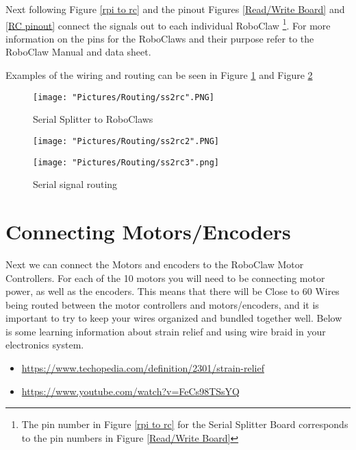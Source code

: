 \documentclass[12pt]{article}
\begin{document}
Next following Figure \ref{rpi to rc} and the pinout Figures \ref{Read/Write Board} and \ref{RC pinout} connect the signals out to each individual RoboClaw \footnote{The pin number in Figure \ref{rpi to rc} for the Serial Splitter Board corresponds to the pin numbers in Figure \ref{Read/Write Board}}. For more information on the pins for the RoboClaws and their purpose refer to the RoboClaw Manual and data sheet. 

\noindent Examples of the wiring and routing can be seen in Figure \ref{ss2rc1} and Figure \ref{ss2rc2}

\begin{figure}[H]
 	\centering
	\texttt{[image: "Pictures/Routing/ss2rc".PNG]}
 	\caption{Serial Splitter to RoboClaws}
	\label{ss2rc1}
\end{figure}

\begin{figure}[H]
 	\centering
  	\begin{minipage}[b]{0.50\textwidth}
		\texttt{[image: "Pictures/Routing/ss2rc2".PNG]}
  	\end{minipage}
  	\hfill
  	\begin{minipage}[b]{0.40\textwidth}
    		\texttt{[image: "Pictures/Routing/ss2rc3".png]}
  	\end{minipage}
	\caption{Serial signal routing}
	\label{ss2rc2}
\end{figure}

\section{Connecting Motors/Encoders}

Next we can connect the Motors and encoders to the RoboClaw Motor Controllers. For each of the 10 motors you will need to be connecting motor power, as well as the encoders. This means that there will be Close to 60 Wires being routed between the motor controllers and motors/encoders, and it is important to try to keep your wires organized and bundled together well. Below is some learning information about strain relief and using wire braid in your electronics system.

\begin{itemize}
	\item \href{https://www.techopedia.com/definition/2301/strain-relief}{https://www.techopedia.com/definition/2301/strain-relief}
	\item \href{https://www.youtube.com/watch?v=FeCs98TSsYQ}{https://www.youtube.com/watch?v=FeCs98TSsYQ}
\end{itemize}
\end{document}
